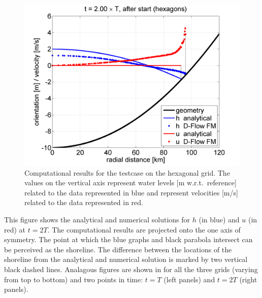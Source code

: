 \begin{figure}[h!]
\begin{center}
\includegraphics[width=0.57\columnwidth]{../../c043_thacker2d_hexagons/doc/figures/thacker2dhexagonsT2.png}
\end{center}\caption{Computational results for the testcase on the hexagonal grid. The values on the vertical axis represent water levels [m w.r.t.\ reference] related to the data represented in blue and represent velocities [m/s] related to the data represented in red. \label{fig:thacker2dhexagonsT2}}
\end{figure}

This figure shows the analytical and numerical solutions for $h$ (in blue) and $u$ (in red) at $t = 2T$. The computational results are projected onto the one axis of symmetry. The point at which the blue graphs and black parabola intersect can be perceived as the shoreline. The difference between the locations of the shoreline from the analytical and numerical solution is marked by two vertical black dashed lines. Analagous figures are shown in  for all the three grids (varying from top to bottom) and two points in time: $t = T$ (left panels) and $t = 2T$ (right panels).

